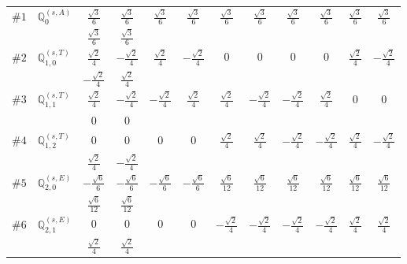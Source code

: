 \documentclass[fleqn,9pt,landscape]{jsarticle}
\begin{document}
\begin{center}
\begin{longtable}{lcccccccccc}
$ \#1\quad \mathbb{Q}_{0}^{(s,A)} $ & $ \frac{\sqrt{3}}{6} $ & $ \frac{\sqrt{3}}{6} $ & $ \frac{\sqrt{3}}{6} $ & $ \frac{\sqrt{3}}{6} $ & $ \frac{\sqrt{3}}{6} $ & $ \frac{\sqrt{3}}{6} $ & $ \frac{\sqrt{3}}{6} $ & $ \frac{\sqrt{3}}{6} $ & $ \frac{\sqrt{3}}{6} $ & $ \frac{\sqrt{3}}{6} $ \\
& $ \frac{\sqrt{3}}{6} $ & $ \frac{\sqrt{3}}{6} $ & $  $ & $  $ & $  $ & $  $ & $  $ & $  $ & $  $ & $  $ \\ \hline
$ \#2\quad \mathbb{Q}_{1,0}^{(s,T)} $ & $ \frac{\sqrt{2}}{4} $ & $ - \frac{\sqrt{2}}{4} $ & $ \frac{\sqrt{2}}{4} $ & $ - \frac{\sqrt{2}}{4} $ & $ 0 $ & $ 0 $ & $ 0 $ & $ 0 $ & $ \frac{\sqrt{2}}{4} $ & $ - \frac{\sqrt{2}}{4} $ \\
& $ - \frac{\sqrt{2}}{4} $ & $ \frac{\sqrt{2}}{4} $ & $  $ & $  $ & $  $ & $  $ & $  $ & $  $ & $  $ & $  $ \\ \hline
$ \#3\quad \mathbb{Q}_{1,1}^{(s,T)} $ & $ \frac{\sqrt{2}}{4} $ & $ - \frac{\sqrt{2}}{4} $ & $ - \frac{\sqrt{2}}{4} $ & $ \frac{\sqrt{2}}{4} $ & $ \frac{\sqrt{2}}{4} $ & $ - \frac{\sqrt{2}}{4} $ & $ - \frac{\sqrt{2}}{4} $ & $ \frac{\sqrt{2}}{4} $ & $ 0 $ & $ 0 $ \\
& $ 0 $ & $ 0 $ & $  $ & $  $ & $  $ & $  $ & $  $ & $  $ & $  $ & $  $ \\ \hline
$ \#4\quad \mathbb{Q}_{1,2}^{(s,T)} $ & $ 0 $ & $ 0 $ & $ 0 $ & $ 0 $ & $ \frac{\sqrt{2}}{4} $ & $ \frac{\sqrt{2}}{4} $ & $ - \frac{\sqrt{2}}{4} $ & $ - \frac{\sqrt{2}}{4} $ & $ \frac{\sqrt{2}}{4} $ & $ - \frac{\sqrt{2}}{4} $ \\
& $ \frac{\sqrt{2}}{4} $ & $ - \frac{\sqrt{2}}{4} $ & $  $ & $  $ & $  $ & $  $ & $  $ & $  $ & $  $ & $  $ \\ \hline
$ \#5\quad \mathbb{Q}_{2,0}^{(s,E)} $ & $ - \frac{\sqrt{6}}{6} $ & $ - \frac{\sqrt{6}}{6} $ & $ - \frac{\sqrt{6}}{6} $ & $ - \frac{\sqrt{6}}{6} $ & $ \frac{\sqrt{6}}{12} $ & $ \frac{\sqrt{6}}{12} $ & $ \frac{\sqrt{6}}{12} $ & $ \frac{\sqrt{6}}{12} $ & $ \frac{\sqrt{6}}{12} $ & $ \frac{\sqrt{6}}{12} $ \\
& $ \frac{\sqrt{6}}{12} $ & $ \frac{\sqrt{6}}{12} $ & $  $ & $  $ & $  $ & $  $ & $  $ & $  $ & $  $ & $  $ \\ \hline
$ \#6\quad \mathbb{Q}_{2,1}^{(s,E)} $ & $ 0 $ & $ 0 $ & $ 0 $ & $ 0 $ & $ - \frac{\sqrt{2}}{4} $ & $ - \frac{\sqrt{2}}{4} $ & $ - \frac{\sqrt{2}}{4} $ & $ - \frac{\sqrt{2}}{4} $ & $ \frac{\sqrt{2}}{4} $ & $ \frac{\sqrt{2}}{4} $ \\
& $ \frac{\sqrt{2}}{4} $ & $ \frac{\sqrt{2}}{4} $ & $  $ & $  $ & $  $ & $  $ & $  $ & $  $ & $  $ & $  $ \\ \hline

\end{longtable}
\end{center}
\end{document}
